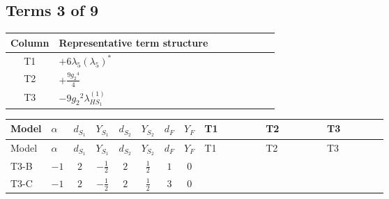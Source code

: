 \documentclass[8pt]{article}
\begin{document}
\begin{landscape}
\subsection*{Terms 3 of 9}
\begin{center}
\begin{tabular}{@{}c >{\raggedright\arraybackslash}p{0.82\linewidth}@{}}
\toprule
Column & Representative term structure \\
\midrule
T1 & \(\displaystyle +6 {\lambda_5} \left({\lambda_5}\right)^{*}\) \\
\midrule
T2 & \(\displaystyle +\frac{9 {g_2}^4}{4}\) \\
\midrule
T3 & \(\displaystyle -9 {g_2}^2 {\lambda_{HS_1}^{(1)}}\) \\
\midrule
\bottomrule
\end{tabular}
\end{center}
\smallskip
\tiny
\begin{longtable}{@{}llcccccc >{\raggedright\arraybackslash}p{0.21\linewidth} >{\raggedright\arraybackslash}p{0.21\linewidth} >{\raggedright\arraybackslash}p{0.21\linewidth}@{}}
\toprule
Model & $\alpha$ & $d_{S_1}$ & $Y_{S_1}$ & $d_{S_2}$ & $Y_{S_2}$ & $d_F$ & $Y_F$ & T1 & T2 & T3 \\
\midrule
\endfirsthead
\toprule
Model & $\alpha$ & $d_{S_1}$ & $Y_{S_1}$ & $d_{S_2}$ & $Y_{S_2}$ & $d_F$ & $Y_F$ & T1 & T2 & T3 \\
\midrule
\endhead
T3-B & $-1$ & $2$ & $-\frac{1}{2}$ & $2$ & $\frac{1}{2}$ & $1$ & $0$ & \scriptsize\adjustbox{max width=\linewidth}{$\begin{gathered} +6 {\lambda_5} \left({\lambda_5}\right)^{*}\end{gathered}$} & \scriptsize\adjustbox{max width=\linewidth}{$\begin{gathered} +\frac{9 {g_2}^4}{4}\end{gathered}$} & \scriptsize\adjustbox{max width=\linewidth}{$\begin{gathered} -9 {g_2}^2 {\lambda_{HS_1}^{(1)}}\end{gathered}$} \\
\midrule
T3-C & $-1$ & $2$ & $-\frac{1}{2}$ & $2$ & $\frac{1}{2}$ & $3$ & $0$ & \scriptsize\adjustbox{max width=\linewidth}{$\begin{gathered} +6 {\lambda_5} \left({\lambda_5}\right)^{*}\end{gathered}$} & \scriptsize\adjustbox{max width=\linewidth}{$\begin{gathered} +\frac{9 {g_2}^4}{4}\end{gathered}$} & \scriptsize\adjustbox{max width=\linewidth}{$\begin{gathered} -9 {g_2}^2 {\lambda_{HS_1}^{(1)}}\end{gathered}$} \\

\end{longtable}
\end{landscape}
\end{document}
